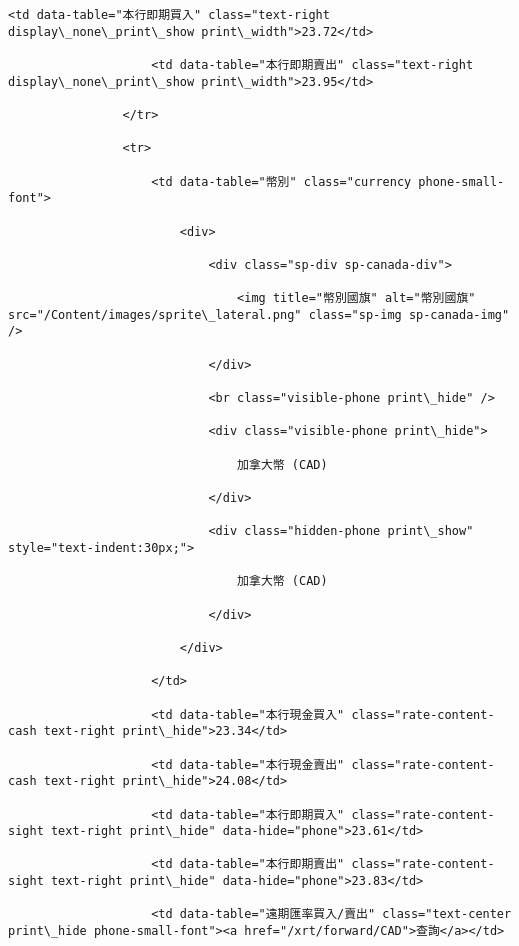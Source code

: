 \documentclass[11pt]{article}
\begin{document}
\begin{Verbatim}[commandchars=\\\{\}]
                    <td data-table="本行即期買入" class="text-right display\_none\_print\_show print\_width">23.72</td>

                    <td data-table="本行即期賣出" class="text-right display\_none\_print\_show print\_width">23.95</td>

                </tr>

                <tr>

                    <td data-table="幣別" class="currency phone-small-font">

                        <div>

                            <div class="sp-div sp-canada-div">

                                <img title="幣別國旗" alt="幣別國旗" src="/Content/images/sprite\_lateral.png" class="sp-img sp-canada-img" />

                            </div>

                            <br class="visible-phone print\_hide" />

                            <div class="visible-phone print\_hide">

                                加拿大幣 (CAD)

                            </div>

                            <div class="hidden-phone print\_show" style="text-indent:30px;">

                                加拿大幣 (CAD)

                            </div>

                        </div>

                    </td>

                    <td data-table="本行現金買入" class="rate-content-cash text-right print\_hide">23.34</td>

                    <td data-table="本行現金賣出" class="rate-content-cash text-right print\_hide">24.08</td>

                    <td data-table="本行即期買入" class="rate-content-sight text-right print\_hide" data-hide="phone">23.61</td>

                    <td data-table="本行即期賣出" class="rate-content-sight text-right print\_hide" data-hide="phone">23.83</td>

                    <td data-table="遠期匯率買入/賣出" class="text-center print\_hide phone-small-font"><a href="/xrt/forward/CAD">查詢</a></td>


\end{Verbatim}
\end{document}
